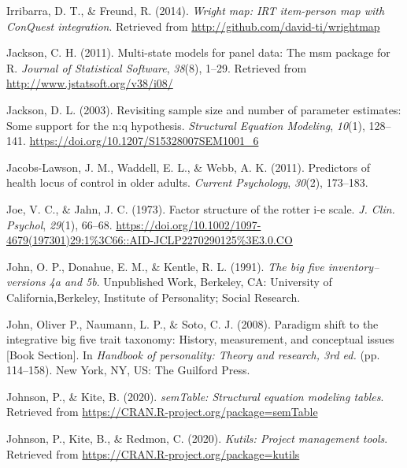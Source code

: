 \documentclass[
  man]{apa6}
\newlength{\cslhangindent}
\newlength{\cslentryspacingunit} %
\newenvironment{CSLReferences}[2] %
 {%
  \setlength{\parindent}{0pt}
  \ifodd #1
  \let\oldpar\par
  \def\par{\hangindent=\cslhangindent\oldpar}
  \fi
  \setlength{\parskip}{#2\cslentryspacingunit}
 }%
 {}
\begin{document}
\begin{CSLReferences}{1}{0}
\leavevmode{}%
Irribarra, D. T., \& Freund, R. (2014). \emph{Wright map: IRT item-person map with ConQuest integration}. Retrieved from \url{http://github.com/david-ti/wrightmap}

\leavevmode{}%
Jackson, C. H. (2011). Multi-state models for panel data: The {msm} package for {R}. \emph{Journal of Statistical Software}, \emph{38}(8), 1--29. Retrieved from \url{http://www.jstatsoft.org/v38/i08/}

\leavevmode{}%
Jackson, D. L. (2003). Revisiting sample size and number of parameter estimates: Some support for the n:q hypothesis. \emph{Structural Equation Modeling}, \emph{10}(1), 128--141. \url{https://doi.org/10.1207/S15328007SEM1001_6}

\leavevmode{}%
Jacobs-Lawson, J. M., Waddell, E. L., \& Webb, A. K. (2011). Predictors of health locus of control in older adults. \emph{Current Psychology}, \emph{30}(2), 173--183.

\leavevmode{}%
Joe, V. C., \& Jahn, J. C. (1973). Factor structure of the rotter i-e scale. \emph{J. Clin. Psychol}, \emph{29}(1), 66--68. \url{https://doi.org/10.1002/1097-4679(197301)29:1\%3C66::AID-JCLP2270290125\%3E3.0.CO}

\leavevmode{}%
John, O. P., Donahue, E. M., \& Kentle, R. L. (1991). \emph{The big five inventory--versions 4a and 5b}. Unpublished Work, Berkeley, CA: University of California,Berkeley, Institute of Personality; Social Research.

\leavevmode{}%
John, Oliver P., Naumann, L. P., \& Soto, C. J. (2008). Paradigm shift to the integrative big five trait taxonomy: History, measurement, and conceptual issues {[}Book Section{]}. In \emph{Handbook of personality: Theory and research, 3rd ed.} (pp. 114--158). New York, NY, US: The Guilford Press.

\leavevmode{}%
Johnson, P., \& Kite, B. (2020). \emph{semTable: Structural equation modeling tables}. Retrieved from \url{https://CRAN.R-project.org/package=semTable}

\leavevmode{}%
Johnson, P., Kite, B., \& Redmon, C. (2020). \emph{Kutils: Project management tools}. Retrieved from \url{https://CRAN.R-project.org/package=kutils}


\end{CSLReferences}
\end{document}
